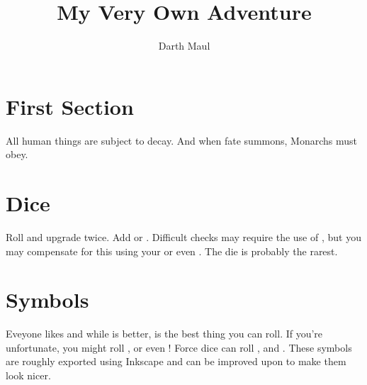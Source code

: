 \documentclass[a4paper]{article}
\title{My Very Own Adventure}
\author{Darth Maul}
\begin{document}
\maketitle

\section{First Section}
    All human things are subject to decay. And when fate summons, Monarchs must obey.


\begin{multicols}{2}

\section{Dice}

Roll \difficulty\difficulty and upgrade twice. Add \boost or \setback\setback.
Difficult checks may require the use of \challenge, but you may compensate for
this using your \ability\ability or even \proficiency. The \force die is
probably the rarest.

\section{Symbols}

Eveyone likes \success and while \advantage is better, \triumph is the best
thing you can roll. If you're unfortunate, you might roll \failure, \threat or
even \despair! Force dice can roll \light, \dark and \darklight. These symbols
are roughly exported using Inkscape and can be improved upon to make them look
nicer.


\vspace{1em}
\vspace{1em}

\vspace{1em}
\Creature[presence=1, soak=3, wounds=6]{}
\vspace{1em}

\vspace{1em}
\Race[presence=1]{}
\vspace{1em}

\end{multicols}
\end{document}
